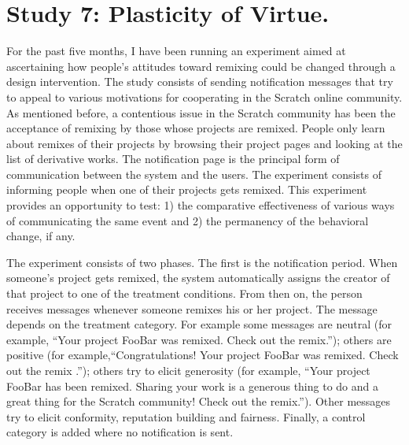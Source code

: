 





\section{Study 7: Plasticity of Virtue.}
For the past five months, I have been running an experiment aimed at ascertaining how people's attitudes toward remixing could be changed through a design intervention.
The study consists of sending notification messages that try to appeal to various motivations for cooperating in the Scratch online community. 
As mentioned before, a contentious issue in the Scratch community has been the acceptance of remixing by those whose projects are remixed. 
People only learn about remixes of their projects by browsing their project pages and looking at the list of derivative works. 
The notification page is the principal form of communication between the system and the users.
The experiment consists of informing people when one of their projects gets remixed.
This experiment provides an opportunity to test: 1) the comparative effectiveness of various ways of communicating the same event and 2) the permanency of the behavioral change, if any. 

The experiment consists of two phases.
The first is the notification period. 
When someone's project gets remixed, the system automatically assigns the creator of that project to one of the treatment conditions. 
From then on, the person receives messages whenever someone remixes his or her project. The message depends on the treatment category.
For example some messages are neutral (for example, ``Your project FooBar was remixed. Check out the remix.''); 
others are positive (for example,``Congratulations! Your project FooBar was remixed. Check out the remix .'');
others try to elicit generosity (for example, ``Your project FooBar has been remixed. Sharing your work is a generous thing to do and a great thing for the Scratch community! Check out the remix.'').
Other messages try to elicit conformity, reputation building and fairness.
Finally, a control category is added where no notification is sent.

